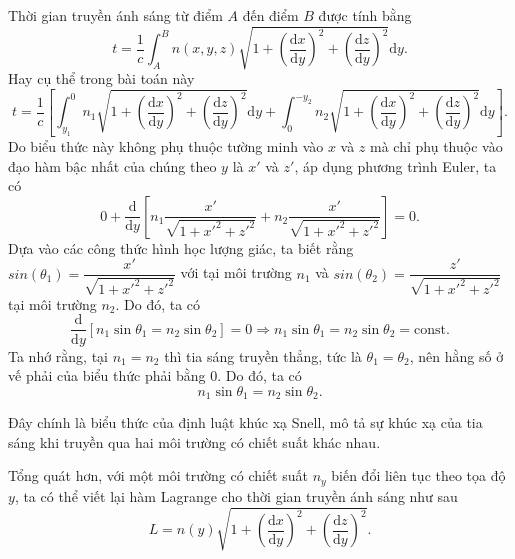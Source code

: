 Thời gian truyền ánh sáng từ điểm \(A\) đến điểm \(B\) được tính bằng
\begin{equation}
    t = \dfrac{1}{c} \int_{A}^{B} n(x,y,z) \sqrt{1 + \left( \dfrac{\mathrm{d} x}{\mathrm{d} y}\right)^2 + \left( \dfrac{\mathrm{d} z}{\mathrm{d} y}\right)^2} \mathrm{d}y.
\end{equation}
Hay cụ thể trong bài toán này
\begin{equation}
    t = \dfrac{1}{c} \left[ \int_{y_1}^{0} n_1 \sqrt{1 + \left( \dfrac{\mathrm{d} x}{\mathrm{d} y}\right)^2 + \left( \dfrac{\mathrm{d} z}{\mathrm{d} y}\right)^2} \mathrm{d}y + \int_{0}^{-y_2} n_2 \sqrt{1 + \left( \dfrac{\mathrm{d} x}{\mathrm{d} y}\right)^2 + \left( \dfrac{\mathrm{d} z}{\mathrm{d} y}\right)^2} \mathrm{d}y \right] .
\end{equation}
Do biểu thức này không phụ thuộc tường minh vào \(x\) và \(z\) mà chỉ phụ thuộc vào đạo hàm bậc nhất của chúng theo \(y\) là \(x'\) và \(z'\), áp dụng phương trình Euler, ta có
\begin{equation}
    0 + \dfrac{\mathrm{d}}{\mathrm{d}y} \left[ n_1 \dfrac{x'}{\sqrt{1+x'^2+z'^2}}  + n_2 \dfrac{x'}{\sqrt{1+x'^2+z'^2}} \right] = 0.
\end{equation}
Dựa vào các công thức hình học lượng giác, ta biết rằng \(sin \left( \theta_1 \right) = \dfrac{x'}{\sqrt{1+x'^2+z'^2}} \) với tại môi trường \(n_1\) và \(sin \left( \theta_2 \right) = \dfrac{z'}{\sqrt{1+x'^2+z'^2}} \) tại môi trường \(n_2\). Do đó, ta có
\begin{equation}
    \dfrac{\mathrm{d}}{\mathrm{d}y} \left[ n_1 \sin \theta_1 = n_2 \sin \theta_2 \right] = 0 \Rightarrow n_1 \sin \theta_1 = n_2 \sin \theta_2 = \text{const}.
\end{equation}
Ta nhớ rằng, tại \(n_1 = n_2\) thì tia sáng truyền thẳng, tức là \(\theta_1 = \theta_2\), nên hằng số ở vế phải của biểu thức phải bằng 0. Do đó, ta có
\begin{equation}    
    n_1 \sin \theta_1 = n_2 \sin \theta_2.
\end{equation}

Đây chính là biểu thức của định luật khúc xạ Snell, mô tả sự khúc xạ của tia sáng khi truyền qua hai môi trường có chiết suất khác nhau.

Tổng quát hơn, với một môi trường có chiết suất \(n_y\) biến đổi liên tục theo tọa độ \(y\), ta có thể viết lại hàm Lagrange cho thời gian truyền ánh sáng như sau
\begin{equation}
    L = n(y) \sqrt{1 + \left( \dfrac{\mathrm{d} x}{\mathrm{d} y}\right)^2 + \left( \dfrac{\mathrm{d} z}{\mathrm{d} y}\right)^2}.
\end{equation}

